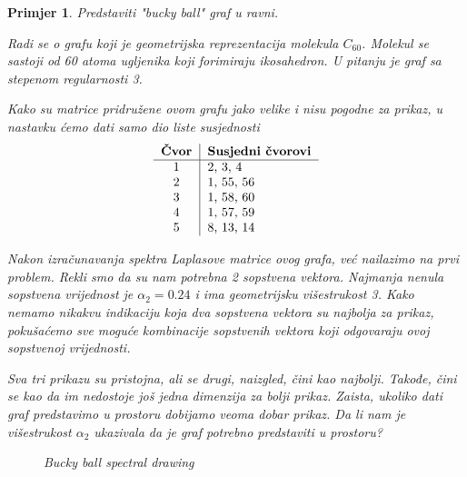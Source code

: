 \documentclass[11pt]{article}
\newtheorem{example}{Primjer}
\begin{document}
    \begin{example}
        Predstaviti "bucky ball" graf u ravni. 
        
        Radi se o grafu koji je geometrijska reprezentacija molekula $C_{60}$. Molekul se sastoji od 60 atoma ugljenika koji forimiraju ikosahedron.
        U pitanju je graf sa stepenom regularnosti 3.
        
        Kako su matrice pridružene ovom grafu jako velike i nisu pogodne za prikaz, u nastavku ćemo dati samo dio liste susjednosti
        \[
            \begin{tabular}{c|l}
                \textbf{Čvor} & \textbf{Susjedni čvorovi} \\
                \hline
                1 & 2, 3, 4 \\
                2 & 1, 55, 56 \\
                3 & 1, 58, 60 \\
                4 & 1, 57, 59 \\
                5 & 8, 13, 14 \\
        \end{tabular}
        \]

        Nakon izračunavanja spektra Laplasove matrice ovog grafa, već nailazimo na prvi problem.
		Rekli smo da su nam potrebna 2 sopstvena vektora.
		Najmanja nenula sopstvena vrijednost je $\alpha_2 = 0.24$ i ima geometrijsku višestrukost 3.
		Kako nemamo nikakvu indikaciju koja dva sopstvena vektora su najbolja za prikaz, pokušaćemo sve moguće kombinacije sopstvenih vektora koji odgovaraju ovoj sopstvenoj vrijednosti.

		Sva tri prikazu su pristojna, ali se drugi, naizgled, čini kao najbolji.
		Takođe, čini se kao da im nedostoje još jedna dimenzija za bolji prikaz.
		Zaista, ukoliko dati graf predstavimo u prostoru dobijamo veoma dobar prikaz.
		Da li nam je višestrukost $\alpha_2$ ukazivala da je graf potrebno predstaviti u prostoru?

		\begin{figure}[H]
			\centering
			\hfill
			
			\vspace{0.2cm} %
			
			\hfill
		
			\caption{Bucky ball spectral drawing}
		\end{figure}

		
    \end{example}
    
\end{document}
